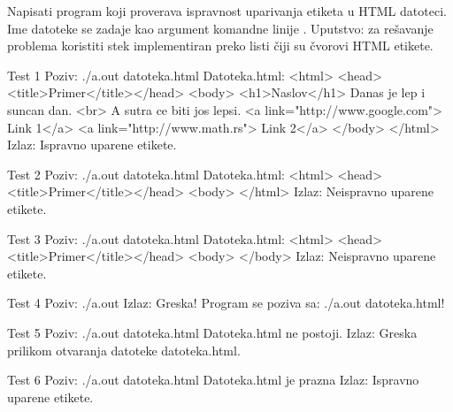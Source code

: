 \begin{Exercise}[label=606]
Napisati program koji proverava ispravnost uparivanja etiketa u HTML datoteci. Ime datoteke se zadaje kao argument komandne linije . 
Uputstvo: za rešavanje problema koristiti stek implementiran preko listi čiji su čvorovi HTML etikete.

\begin{maxitest}
    \begin{test}{Test 1}
Poziv: ./a.out datoteka.html
Datoteka.html:                          
<html>                                  
  <head><title>Primer</title></head>               
  <body>                                           
    <h1>Naslov</h1>                                
    Danas je lep i suncan dan. <br>                
    A sutra ce biti jos lepsi.     
    <a link="http://www.google.com"> Link 1</a>    
    <a link="http://www.math.rs"> Link 2</a>
  </body>
</html>
Izlaz: Ispravno uparene etikete.
    \end{test}
\end{maxitest}

\begin{maxitest}    
  \begin{test}{Test 2}
Poziv: ./a.out datoteka.html
Datoteka.html:                         
<html>                                 
  <head><title>Primer</title></head>               
  <body>  
</html>
Izlaz: Neispravno uparene etikete.
  \end{test}
\end{maxitest}

\begin{maxitest}      
  \begin{test}{Test 3}
Poziv: ./a.out datoteka.html
Datoteka.html:                         
<html>                                  
  <head><title>Primer</title></head>               
  <body>  
  </body>
Izlaz: Neispravno uparene etikete.
  \end{test}
\end{maxitest}


\begin{maxitest}
    \begin{test}{Test 4}
Poziv: ./a.out 
Izlaz: Greska! Program se poziva sa: ./a.out datoteka.html!
    \end{test}
\end{maxitest}


\begin{maxitest}
    \begin{test}{Test 5}
Poziv: ./a.out datoteka.html
Datoteka.html ne postoji.
Izlaz: Greska prilikom otvaranja datoteke datoteka.html.
    \end{test}
\end{maxitest}

\begin{maxitest}
    \begin{test}{Test 6}
Poziv: ./a.out datoteka.html
Datoteka.html je prazna
Izlaz: Ispravno uparene etikete.
    \end{test}
\end{maxitest}

\end{Exercise}
